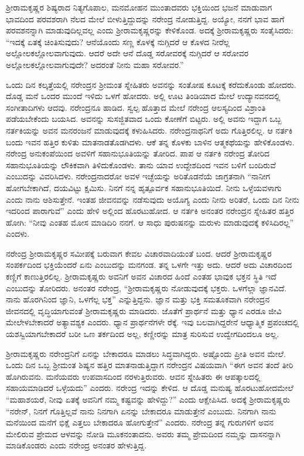ಶ‍್ರೀರಾಮಕೃಷ್ಣರ ಶಿಷ್ಯರಾದ ನಿತ್ಯಗೊಪಾಲ, ಮನಮೋಹನ ಮುಂತಾದವರು ಭಕ್ತಿಯಿಂದ ಭಜನೆ ಮಾಡುವಾಗ ಭಾವದಿಂದ ಪರವಶರಾಗಿ ನೆಲದ ಮೇಲೆ ಬೀಳುತ್ತಿದ್ದುದನ್ನು ನರೇಂದ್ರ ನೋಡುತ್ತಿದ್ದ. ಅಯ್ಯೋ, ನನಗೆ ಭಾವ ಹಾಗೆ ಪರವಶನನ್ನಾಗಿ ಮಾಡುವುದಿಲ್ಲವಲ್ಲ ಎಂದು ಶ‍್ರೀರಾಮಕೃಷ್ಣರನ್ನು ಕೇಳಿಕೊಂಡ. ಅದಕ್ಕೆ ಶ‍್ರೀರಾಮಕೃಷ್ಣರು ಸಂತೈಸಿದರು: “ಇದಕ್ಕೆ ಏತಕ್ಕೆ ಚಿಂತಿಸುವುದು? ಆನೆಯೊಂದು ಸಣ್ಣ ಕೊಳಕ್ಕೆ ನುಗ್ಗಿದರೆ ಆ ಕೊಳದ ನೀರೆಲ್ಲ ಅಲ್ಲೋಲಕಲ್ಲೋಲವಾಗುವುದು. ಆದರೆ ಅದೇ ಆನೆ ದೊಡ್ಡ ಸರೋವರಕ್ಕೆ ನುಗ್ಗಿದರೆ ಆ ಸರೋವರ ಅಲ್ಲೋಲಕಲ್ಲೋಲವಾಗುವುದೇ? ಅದರಂತೆ ನೀನು ಮಹಾ ಸರೋವರ.”

ಒಂದು ದಿನ ಕಲ್ಕತ್ತೆಯಲ್ಲಿ ನರೇಂದ್ರನ ಶ‍್ರೀಮಂತ ಸ್ನೇಹಿತರು ಅವನನ್ನು ಸಂತೋಷ ಕೂಟಕ್ಕೆ ಕರೆದುಕೊಂಡು ಹೋದರು. ದೊಡ್ಡ ಮನೆ ಒಂದರ ಮುಂದೆ ಇಳಿದು ಒಳಗೆ ಹೋದರು. ಅಲ್ಲಿ ಊಟ ತಿಂಡಿಯಾದ ಮೇಲೆ ಉದ್ಯಾನವನದಲ್ಲಿ ಸಂಗೀತಾದಿಗಳು ಆದವು. ನರೇಂದ್ರನೂ ಹಾಡಿದ. ಸ್ವಲ್ಪ ಹೊತ್ತಾದ ಮೇಲೆ ನರೇಂದ್ರ ಆಲಸ್ಯದಿಂದ ವಿಶ್ರಾಂತಿ ಪಡೆಯಬೇಕೆಂದು ಬಯಸಿದ. ಅವನನ್ನು ಸುಸಜ್ಜಿತವಾದ ಒಂದು ಕೋಣೆಗೆ ಬಿಟ್ಟರು. ಅಲ್ಲಿ ಅವನು ಇದ್ದಾಗ ಒಬ್ಬ ನರ್ತಕಿಯನ್ನು ಅವನ ಮನರಂಜನೆ ಮಾಡುವುದಕ್ಕೆ ಕಳುಹಿಸಿದರು. ನರೇಂದ್ರನಾಥನಿಗೆ ಅದು ಗೊತ್ತಿರಲಿಲ್ಲ. ಆ ನರ್ತಕಿ ಬಂದು ಇವನ ಹತ್ತಿರ ಕುಳಿತು ಮಾತನಾಡತೊಡಗಿದಳು. ಆಕೆ ತನ್ನ ಕೊಳಕು ಬಾಳಿನ ಆತ್ಮಕಥೆಯನ್ನು ಹೇಳಿಕೊಂಡಳು. ನರೇಂದ್ರ ಅನುಕಂಪೆಯಿಂದ ಅವಳಿಗೆ ಸಹಾನುಭೂತಿಯನ್ನು ತೋರಿದ. ಪಾಪ ಆ ನರ್ತಕಿ ನರೇಂದ್ರ ತೋರಿದ ಸಹಾನುಭೂತಿಯನ್ನು ಲೌಕಿಕವಾಗಿ ತಿಳಿದುಕೊಂಡಳು. ತಾನು ಯಾವ ಉದ್ದೇಶದಿಂದ ಇವನ ಬಳಿಗೆ ಬಂದಿರುವೆ ಎಂಬುದನ್ನು ವಿವರಿಸಿದಳು. ನರೇಂದ್ರನಾದರೋ ಅವಳ ಇಚ್ಛೆಯನ್ನು ಅರಿತೊಡನೆಯೆ ಜಾಗ್ರತನಾಗಿ “ನಾನೀಗ ಹೋಗಬೇಕಾಗಿದೆ, ದಯವಿಟ್ಟು ಕ್ಷಮಿಸು. ನಿನಗೆ ನನ್ನ ಹೃತ್ಪೂರ್ವಕ ಸಹಾನುಭೂತಿಯಿದೆ. ನೀನು ಒಳ್ಳೆಯವಳಾಗು ಎಂದು ನಾನು ಆಶಿಸುತ್ತೇನೆ. ಇಂತಹ ಜೀವನವನ್ನು ನಡೆಸುವುದು ಅಯೊಗ್ಯ ಎಂದು ನೀನು ಅರಿತರೆ, ಒಂದು ದಿನ ನೀನು ಇದರಿಂದ ಪಾರಾಗುವೆ” ಎಂದು ಹೇಳಿ ಅಲ್ಲಿಂದ ಹೊರಟುಹೋದ. ಆ ನರ್ತಕಿ ಅನಂತರ ನರೇಂದ್ರನ ಸ್ನೇಹಿತರ ಹತ್ತಿರ ಹೋಗಿ: “ನೀವು ಎಂತಹ ಮೋಸ ಮಾಡಿದಿರಿ ನನಗೆ. ಆ ಸಾಧು ಪುರುಷನನ್ನು ಮರುಳು ಮಾಡುವುದಕ್ಕೆ ಕಳಿಸಿದಿರಲ್ಲ” ಎಂದಳು.

\vskip 2pt

ನರೇಂದ್ರ ಶ‍್ರೀರಾಮಕೃಷ್ಣರ ಸಮೀಪಕ್ಕೆ ಬರುವಾಗ ಕೇವಲ ವಿಚಾರವಾದಿಯಂತೆ ಬಂದ. ಆದರೆ ಶ‍್ರೀರಾಮಕೃಷ್ಣರ ಸಂಪರ್ಕದಿಂದ ಭಕ್ತಿಯೆಂದರೆ ಏನು ಎಂಬುದನ್ನು ಮನಗಂಡ. ತನ್ನ ಒಳಗೇ ಇತ್ತು ಅದು. ಆದರೆ ಅದು ವಿಚಾರದಿಂದ ಕಣ್ಣಿಗೆ ಕಾಣುತ್ತಿರಲಿಲ್ಲ. ಶ‍್ರೀರಾಮಕೃಷ್ಣರು ಅವನಿಗೆ ಅವನ ವಿಚಾರದ ಹಿಂದೆ ಎಂತಹ ಭಾವುಕ ಭಕ್ತನ ಸ್ಥಿತಿ ಇದೆ ಎಂಬುದನ್ನು ತೋರಿದರು. ಅನಂತರ ನರೇಂದ್ರ, “ಶ‍್ರೀರಾಮಕೃಷ್ಣರು ನೋಡುವುದಕ್ಕೆ ಭಕ್ತರು. ಒಳಗೆಲ್ಲಾ ಜ್ಞಾನವಿದೆ. ನಾನು ಹೊರಗಿನಿಂದ ಜ್ಞಾನಿ, ಒಳಗೆಲ್ಲ ಭಕ್ತ” ಎನ್ನುತ್ತಿದ್ದನು. ಜ್ಞಾನ ಮತ್ತು ಭಕ್ತಿ ಸಮತೂಕವಾಗಿ ನರೇಂದ್ರನ ಜೀವನದಲ್ಲಿ ವೃದ್ಧಿಯಾಗುವಂತೆ ಶ‍್ರೀರಾಮಕೃಷ್ಣರು ಮಾಡಿದರು. ಜೊತೆಗೆ ಪ್ರಾರ್ಥನೆ ಮತ್ತು ಧ್ಯಾನ ಎರಡೂ ಜೀವಿ ಮೇಲೇಳಬೇಕಾದರೆ ಅತ್ಯಾವಶ್ಯಕ ಎಂದರು. ಧ್ಯಾನ ಪ್ರಾರ್ಥನೆಗಳೇ ರೆಕ್ಕೆ. ಇವು ಬಲವಾಗಿದ್ದರೇನೆ ಆಧ್ಯಾತ್ಮಿಕ ಪ್ರಪಂಚದಲ್ಲಿ ಯಶಸ್ವಿಯಾಗಬೇಕಾದರೆ ಬರೀ ಒಣ ತರ್ಕದಿಂದ ಅಲ್ಲ, ಕಣ್ಣೀರನ್ನು ಮಾತ್ರ ಸುರಿಸುವ ಉದ್ವೇಗದಿಂದಲೂ ಅಲ್ಲ.

\vskip 2pt

ಶ‍್ರೀರಾಮಕೃಷ್ಣರು ನರೇಂದ್ರನಿಗೆ ಏನನ್ನು ಬೇಕಾದರೂ ಮಾಡಲು ಸಿದ್ಧವಾಗಿದ್ದರು. ಅಷ್ಟೊಂದು ಪ್ರೀತಿ ಅವನ ಮೇಲೆ. ಒಂದು ದಿನ ಒಬ್ಬ ಶ‍್ರೀಮಂತ ಶಿಷ್ಯನ ಹತ್ತಿರ ಮಾತನಾಡುತ್ತಿದ್ದಾಗ ನರೇಂದ್ರನ ವಿಷಯವಾಗಿ “ಈಗ ಅವನ ತಂದೆ ತೀರಿ ಹೊಗಿರುವನು. ಮನೆಯವರು ಉಪವಾಸದಿಂದ ನರಳುತ್ತಿರುವರು. ಆವನ ಸ್ನೇಹಿತರು ಈ ಆಪತ್ಕಾಲದಲ್ಲಿ ಸಹಾಯಮಾಡಿದರೆ ಒಳ್ಳೆಯದು” ಎಂದರು. ನರೇಂದ್ರ ಇದನ್ನು ಕೇಳಿದ. ಆ ದೊಡ್ಡ ಮನುಷ್ಯ ಹೊರಟುಹೋದಮೇಲೆ “ಮಹಾಶಯರೆ, ನೀವು ಏತಕ್ಕೆ ಅವನಿಗೆ ನಮ್ಮ ಕಷ್ಟವನ್ನು ಹೇಳಿದ್ದು?” ಎಂದು ಆಕ್ಷೇಪಿಸಿದ. ಅದಕ್ಕೆ ಶ‍್ರೀರಾಮಕೃಷ್ಣರು “ನರೇನ್, ನಿನಗೆ ಗೊತ್ತಿಲ್ಲವೆ ನಾನು ನಿನಗಾಗಿ ಏನನ್ನು ಬೇಕಾದರೂ ಮಾಡುತ್ತೇನೆ ಎಂಬುದು. ನಿನಗಾಗಿ ನಾನು ಮನೆಯಿಂದ ಮನೆಗೆ ಭಿಕ್ಷೆ ಎತ್ತಲು ಬೇಕಾದರೂ ಹೋಗುತ್ತೇನೆ” ಎಂದರು. ನರೇಂದ್ರ ತನ್ನ ಗುರುಗಳಿಗೆ ಅವನ ಮೇಲಿರುವ ಪ್ರೇಮದ ಆಳವನ್ನು ನೋಡಿ ಮೂಕನಂತಾದನು. ಅವರು ತಮ್ಮ ಪ್ರೇಮದಿಂದ ನಮ್ಮನ್ನು ದಾಸನನ್ನಾಗಿ ಮಾಡಿಕೊಂಡರು ಎಂದು ನರೇಂದ್ರ ಅನಂತರ ಹೇಳುತ್ತಿದ್ದ.

